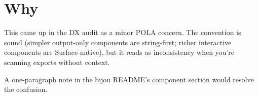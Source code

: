 \section{Why}\label{record-317-why}

This came up in the DX audit as a minor POLA concern. The convention is sound (simpler output-only components are string-first; richer interactive components are Surface-native), but it reads as inconsistency when you're scanning exports without context.

A one-paragraph note in the bijou README's component section would resolve the confusion.

